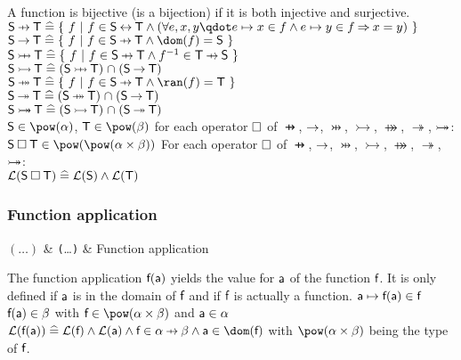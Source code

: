 \begin{samepage}
\begin{rodinrefentry}
  A function is bijective (is a bijection) if it is both injective and surjective.
  \rrdef
  $\exprs \pfun \exprt \defi \{~ f ~|~ f\in \exprs\rel \exprt \land (\forall e,x,y \qdot e\mapsto x\in f \land e\mapsto y\in f \limp x=y) ~\}$\\
  $\exprs \tfun \exprt \defi \{~ f ~|~ f\in \exprs\pfun \exprt \land \dom(f) = \exprs ~\}$\\
  $\exprs \pinj \exprt \defi \{~ f ~|~ f\in \exprs\pfun \exprt \land f^{-1} \in  \exprt\pfun \exprs ~\}$\\
  $\exprs \tinj \exprt \defi (\exprs\pinj \exprt) \binter (\exprs\tfun \exprt)$\\
  $\exprs \psur \exprt \defi \{~ f ~|~ f\in \exprs\pfun \exprt \land \ran(f) = \exprt ~\}$\\
  $\exprs \tsur \exprt \defi (\exprs\psur \exprt) \binter (\exprs\tfun \exprt)$\\
  $\textsf{S} \mathbin{ \rightarrowtail \mkern-18mu\twoheadrightarrow} \textsf{T} \mathrel{\widehat=} (\textsf{S}\mathbin\rightarrowtail \textsf{T}) \mathbin{\mkern1mu\cap\mkern1mu} (\textsf{S}\mathbin\twoheadrightarrow \textsf{T})$\\
  \rrtypes
    $\exprs\in\pow(\alpha)$, $\exprt\in\pow(\beta)$ for each operator $\mathbin{\Box}$ of $\pfun$, $\mathbin\rightarrow$, $\pinj$, $\tinj$, $\psur$, $\tsur$, $\mathbin{ \rightarrowtail \mkern-18mu\twoheadrightarrow}$:\\
  $\exprs \opelipse \exprt \in \pow(\pow(\alpha\cprod\beta))$
  \rrwd
  For each operator $\mathbin{\Box}$ of $\pfun$, $\mathbin\rightarrow$, $\pinj$, $\tinj$, $\psur$, $\tsur$, $\mathbin{ \rightarrowtail \mkern-18mu\twoheadrightarrow}$:\\
  $\mathcal{L}(\textsf{S}\mathbin{\Box} \textsf{T}) \mathrel{\widehat=} \mathcal{L}(\textsf{S}) \land \mathcal{L}(\textsf{T})$
\end{rodinrefentry}
\end{samepage}

\clearpage
\begin{samepage}
\subsubsection{Function application}
\label{function_application}
\begin{rrnames}
  $(\ldots)$  & \texttt{(}\ldots\texttt{)}  & Function application
\end{rrnames}
\begin{rodinrefentry}
  \rrdesc
    The function application $\textsf{f}(\textsf{a})$ yields the value for $\textsf{a}$ of the function $\textsf{f}$.
    It is only defined if $\textsf{a}$ is in the domain of $\textsf{f}$ and if $\textsf{f}$ is actually a function.
  \rrdef
    $\textsf{a}\mapsto\textsf{f}(\textsf{a})\in\textsf{f}$
  \rrtypes
    $\textsf{f}(\textsf{a})\in\beta$ with $\exprlf\in\pow(\alpha\cprod\beta)$ and $\textsf{a}\in\alpha$
  \rrwd
    $\wdl(\exprlf(\exprla))\defi\wdl(\exprlf)\land\wdl(\exprla)\land\exprlf\in\alpha\pfun\beta \land \exprla\in\dom(\exprlf)$
    with $\pow(\alpha\cprod\beta)$ being the type of $\textsf{f}$.
\end{rodinrefentry}
\end{samepage}

